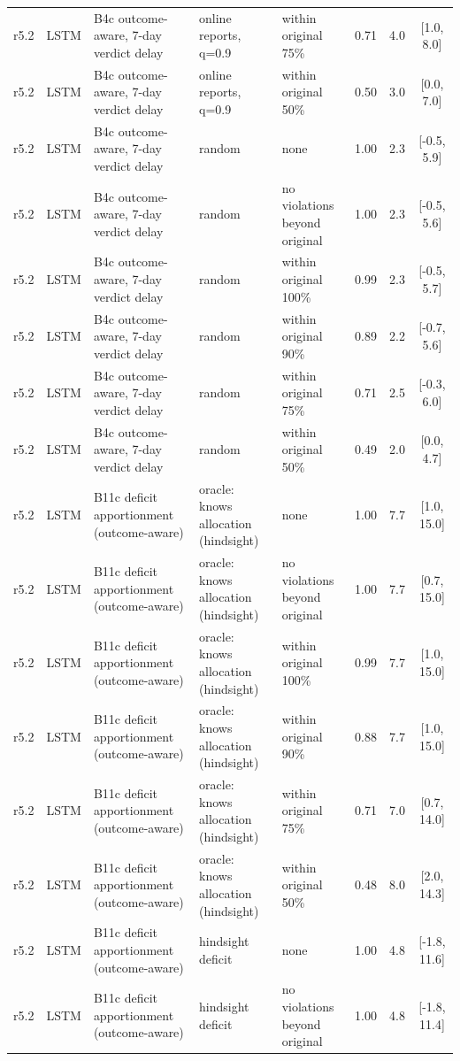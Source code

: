 \begin{longtable}{lllp{4.2cm}p{3.4cm}ccc}
r5.2 & LSTM & B4c outcome-aware, 7-day verdict delay & online reports, q=0.9 & within original 75\% & 0.71 & 4.0 & [1.0, 8.0] \\
r5.2 & LSTM & B4c outcome-aware, 7-day verdict delay & online reports, q=0.9 & within original 50\% & 0.50 & 3.0 & [0.0, 7.0] \\
r5.2 & LSTM & B4c outcome-aware, 7-day verdict delay & random & none & 1.00 & 2.3 & [-0.5, 5.9] \\
r5.2 & LSTM & B4c outcome-aware, 7-day verdict delay & random & no violations beyond original & 1.00 & 2.3 & [-0.5, 5.6] \\
r5.2 & LSTM & B4c outcome-aware, 7-day verdict delay & random & within original 100\% & 0.99 & 2.3 & [-0.5, 5.7] \\
r5.2 & LSTM & B4c outcome-aware, 7-day verdict delay & random & within original 90\% & 0.89 & 2.2 & [-0.7, 5.6] \\
r5.2 & LSTM & B4c outcome-aware, 7-day verdict delay & random & within original 75\% & 0.71 & 2.5 & [-0.3, 6.0] \\
r5.2 & LSTM & B4c outcome-aware, 7-day verdict delay & random & within original 50\% & 0.49 & 2.0 & [0.0, 4.7] \\
r5.2 & LSTM & B11c deficit apportionment (outcome-aware) & oracle: knows allocation (hindsight) & none & 1.00 & 7.7 & [1.0, 15.0] \\
r5.2 & LSTM & B11c deficit apportionment (outcome-aware) & oracle: knows allocation (hindsight) & no violations beyond original & 1.00 & 7.7 & [0.7, 15.0] \\
r5.2 & LSTM & B11c deficit apportionment (outcome-aware) & oracle: knows allocation (hindsight) & within original 100\% & 0.99 & 7.7 & [1.0, 15.0] \\
r5.2 & LSTM & B11c deficit apportionment (outcome-aware) & oracle: knows allocation (hindsight) & within original 90\% & 0.88 & 7.7 & [1.0, 15.0] \\
r5.2 & LSTM & B11c deficit apportionment (outcome-aware) & oracle: knows allocation (hindsight) & within original 75\% & 0.71 & 7.0 & [0.7, 14.0] \\
r5.2 & LSTM & B11c deficit apportionment (outcome-aware) & oracle: knows allocation (hindsight) & within original 50\% & 0.48 & 8.0 & [2.0, 14.3] \\
r5.2 & LSTM & B11c deficit apportionment (outcome-aware) & hindsight deficit & none & 1.00 & 4.8 & [-1.8, 11.6] \\
r5.2 & LSTM & B11c deficit apportionment (outcome-aware) & hindsight deficit & no violations beyond original & 1.00 & 4.8 & [-1.8, 11.4] \\

\end{longtable}
